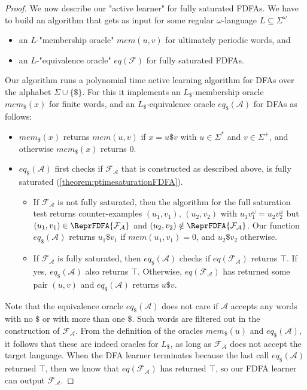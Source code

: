 \documentclass[a4paper,USenglish,cleveref,autoref,thm-restate]{lipics-v2021}
\newcommand{\mc}[1]{\ensuremath{\mathcal{#1}}}
\newcommand{\A}{\mc{A}}
\newcommand{\F}{\mc{F}}
\newcommand{\moracle}{\textit{mem}}
\newcommand{\eoracle}{\textit{eq}}
\begin{document}
{\begin{proof}
  We now describe our "active learner" for fully saturated FDFAs.   We have to build an algorithm that gets as input for some regular $\omega$-language $L \subseteq \Sigma^\omega$
  \begin{itemize}
  \item an $L$-"membership oracle" $\moracle(u,v)$ for ultimately periodic words, and 
  \item an $L$-"equivalence oracle" $\eoracle(\F)$ for fully saturated FDFAs.
  \end{itemize}
Our algorithm runs a polynomial time active learning algorithm for DFAs over the alphabet $\Sigma \cup \{\$\}$. For this it implements an $L_\$$-membership oracle $\moracle_\$(x)$ for finite words, and an $L_\$$-equivalence oracle $\eoracle_\$(\A)$ for DFAs as follows:
  \begin{itemize}
  \item $\moracle_\$(x)$ returns $\moracle(u,v)$ if $x= u\$v$ with $u \in \Sigma^*$ and $v \in \Sigma^+$, and otherwise $\moracle_\$(x)$ returns $0$.
  \item $\eoracle_\$(\A)$ first checks if $\F_\A$ that is constructed as described above, is fully saturated (\cref{theorem:ptimesaturationFDFA}).
    \begin{itemize}
    \item If $\F_\A$ is not fully saturated, then the algorithm for the full saturation test returns counter-examples $(u_1,v_1)$, $(u_2,v_2)$ with $u_1v_1^\omega = u_2v_2^\omega$ but $(u_1,v_1) \in \ReprFDFA{\F_\A}$ and $(u_2,v_2) \notin \ReprFDFA{\F_\A}$. Our function $\eoracle_\$(\A)$ returns $u_1\$v_1$ if $\moracle(u_1,v_1) = 0$, and $u_2\$v_2$ otherwise. 
    \item If $\F_\A$ is fully saturated, then $\eoracle_\$(\A)$ checks if $\eoracle(\F_\A)$ returns $\top$. If yes,  $\eoracle_\$(\A)$ also returns $\top$. Otherwise, $\eoracle(\F_\A)$ has returned some pair $(u,v)$ and $\eoracle_\$(\A)$ returns $u\$v$.
  \end{itemize}
  \end{itemize}
  Note that the equivalence oracle $\eoracle_\$(\A)$ does not care if $\A$ accepts any words with no $\$$ or with more than one $\$$. Such words are filtered out in the construction of $\F_\A$.
  From the definition of the oracles $\moracle_\$(u)$ and $\eoracle_\$(\A)$, it follows that these are indeed oracles for $L_\$$, as long as $\F_\A$ does not accept the target language. 
    When the DFA learner terminates because the last call $\eoracle_\$(\A)$ returned $\top$, then we know that $\eoracle(\F_\A)$ has returned $\top$, so our FDFA learner can output $\F_\A$.


\end{proof}}
\end{document}
